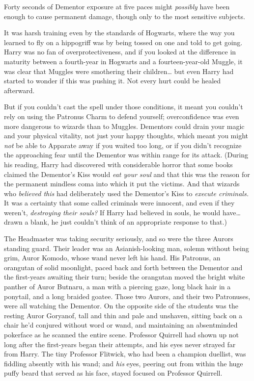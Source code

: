 Forty seconds of Dementor exposure at five paces might \emph{possibly} have 
been enough to cause permanent damage, though only to the most sensitive 
subjects.

It was harsh training even by the standards of Hogwarts, where the way you 
learned to fly on a hippogriff was by being tossed on one and told to get 
going. Harry was no fan of overprotectiveness, and if you looked at the 
difference in maturity between a fourth-year in Hogwarts and a 
fourteen-year-old Muggle, it was clear that Muggles were smothering their 
children{\ldots} but even Harry had started to wonder if this was pushing it. 
Not every hurt could be healed afterward.

But if you couldn't cast the spell under those conditions, it meant you 
couldn't rely on using the Patronus Charm to defend yourself; overconfidence 
was even more dangerous to wizards than to Muggles. Dementors could drain your 
magic and your physical vitality, not just your happy thoughts, which meant you 
might \emph{not} be able to Apparate away if you waited too long, or if you 
didn't recognize the approaching fear until the Dementor was within range for 
its attack. (During his reading, Harry had discovered with considerable horror 
that some books claimed the Dementor's Kiss would \emph{eat your soul} and that 
this was the reason for the permanent mindless coma into which it put the 
victims. And that wizards who \emph{believed this} had deliberately used the 
Dementor's Kiss to \emph{execute criminals.} It was a certainty that some 
called criminals were innocent, and even if they weren't, \emph{destroying 
their souls?} If Harry had believed in souls, he would have{\ldots} drawn a 
blank, he just couldn't think of an appropriate response to that.)

The Headmaster was taking security seriously, and so were the three Aurors 
standing guard. Their leader was an Asianish-looking man, solemn without being 
grim, Auror Komodo, whose wand never left his hand. His Patronus, an orangutan 
of solid moonlight, paced back and forth between the Dementor and the 
first-years awaiting their turn; beside the orangutan moved the bright white 
panther of Auror Butnaru, a man with a piercing gaze, long black hair in a 
ponytail, and a long braided goatee. Those two Aurors, and their two 
Patronuses, were all watching the Dementor. On the opposite side of the 
students was the resting Auror Goryanof, tall and thin and pale and unshaven, 
sitting back on a chair he'd conjured without word or wand, and maintaining an 
absentminded pokerface as he scanned the entire scene. Professor Quirrell had 
shown up not long after the first-years began their attempts, and his eyes 
never strayed far from Harry. The tiny Professor Flitwick, who had been a 
champion duellist, was fiddling absently with his wand; and \emph{his} eyes, 
peering out from within the huge puffy beard that served as his face, stayed 
focused on Professor Quirrell.

